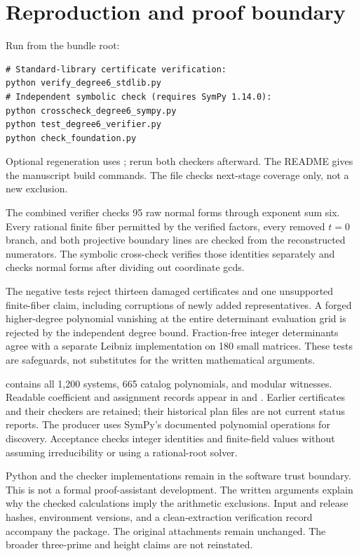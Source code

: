\documentclass[11pt]{article}
\theoremstyle{definition}\newtheorem{definition}[theorem]{Definition}
\theoremstyle{remark}\newtheorem{remark}[theorem]{Remark}
\begin{document}
\section{Reproduction and proof boundary}
Run from the bundle root:
\begin{verbatim}
# Standard-library certificate verification:
python verify_degree6_stdlib.py
# Independent symbolic check (requires SymPy 1.14.0):
python crosscheck_degree6_sympy.py
python test_degree6_verifier.py
python check_foundation.py
\end{verbatim}
Optional regeneration uses ; rerun both checkers afterward. The README gives the manuscript build commands. The file  checks next-stage coverage only, not a new exclusion.

The combined verifier checks 95 raw normal forms through exponent sum six. Every rational finite fiber permitted by the verified factors, every removed $t=0$ branch, and both projective boundary lines are checked from the reconstructed numerators. The symbolic cross-check verifies those identities separately and checks normal forms after dividing out coordinate gcds.

The negative tests reject thirteen damaged certificates and one unsupported finite-fiber claim, including corruptions of newly added representatives. A forged higher-degree polynomial vanishing at the entire determinant evaluation grid is rejected by the independent degree bound. Fraction-free integer determinants agree with a separate Leibniz implementation on 180 small matrices. These tests are safeguards, not substitutes for the written mathematical arguments.

 contains all 1,200 systems, 665 catalog polynomials, and modular witnesses. Readable coefficient and assignment records appear in  and . Earlier certificates and their checkers are retained; their historical plan files are not current status reports. The producer uses SymPy's documented polynomial operations \cite{SymPy} for discovery. Acceptance checks integer identities and finite-field values without assuming irreducibility or using a rational-root solver.

Python and the checker implementations remain in the software trust boundary. This is not a formal proof-assistant development. The written arguments explain why the checked calculations imply the arithmetic exclusions. Input and release hashes, environment versions, and a clean-extraction verification record accompany the package. The original attachments remain unchanged. The broader three-prime and height claims are not reinstated.
\end{document}
